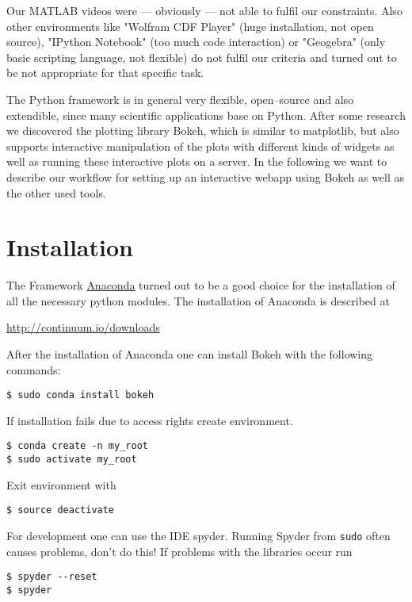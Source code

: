 \documentclass[a4paper,pdftex]{scrartcl}
\begin{document}
Our MATLAB videos were --- obviously --- not able to fulfil our constraints. Also other environments like "Wolfram CDF Player" (huge installation, not open source), "IPython Notebook" (too much code interaction) or "Geogebra" (only basic scripting language, not flexible) do not fulfil our criteria and turned out to be not appropriate for that specific task.

The Python framework is in general very flexible, open--source and also extendible, since many scientific applications base on Python. After some research we discovered the plotting library Bokeh, which is similar to matplotlib, but also supports interactive manipulation of the plots with different kinds of widgets as well as running these interactive plots on a server. In the following we want to describe our workflow for setting up an interactive webapp using Bokeh as well as the other used tools. 

\section{Installation}
The Framework \href{}{Anaconda} turned out to be a good choice for the installation of all the necessary python modules. The installation of Anaconda is described at
\begin{center}
\href{http://continuum.io/downloads}{http://continuum.io/downloads}
\end{center}

After the installation of Anaconda one can install Bokeh with the following commands:
\begin{verbatim}
$ sudo conda install bokeh
\end{verbatim}
If installation fails due to access rights create environment.
\begin{verbatim}
$ conda create -n my_root
$ sudo activate my_root
\end{verbatim}
Exit environment with
\begin{verbatim}
$ source deactivate
\end{verbatim}
For development one can use the IDE spyder. Running Spyder from \verb!sudo! often causes problems, don't do this! If problems with the libraries occur run
\begin{verbatim}
$ spyder --reset
$ spyder
\end{verbatim}
\end{document}
